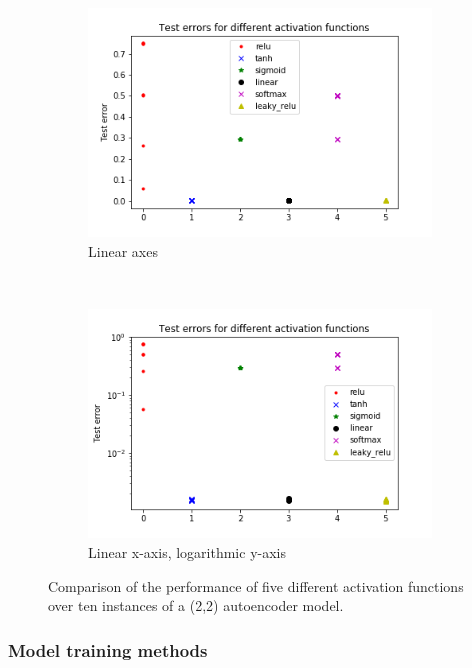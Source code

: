 \documentclass[12pt,onecolumn,letterpaper]{article}
\begin{document}
\begin{figure}[t]
   \centering
   \begin{subfigure}[t]{0.4\textwidth}
       \centering
       \includegraphics[width=\linewidth]{figures/first_act_f_comparisson.png}
       \caption{Linear axes}
   \end{subfigure}
   ~
   \begin{subfigure}[t]{0.4\textwidth}
       \centering
       \includegraphics[width=\linewidth]{figures/first_act_f_comparisson_logy.png}
       \caption{Linear x-axis, logarithmic y-axis}
   \end{subfigure}
   \caption{Comparison of the performance of five different activation functions over ten instances of a (2,2) autoencoder model.}
   \label{fig:ActivationFuncComparison}
\end{figure}

\subsubsection{Model training methods}
\end{document}
